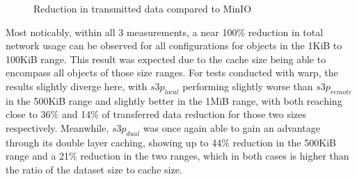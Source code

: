 \bandwidthrems
\pgfplotstabletranspose[colnames from=colnames]\Tbandwidthrems{\bandwidthrems}

\bandwidthduo
\pgfplotstabletranspose[colnames from=colnames]\Tbandwidthduo{\bandwidthduo}


\begin{figure}
	\centering
	\caption{Reduction in transmitted data compared to MinIO}
	\label{fig:bandwidth}
\end{figure}

Most noticably, within all 3 measurements, a near 100\% reduction in total network usage can be observed for all configurations for objects in the 1KiB to 100KiB range. This result was expected due to the cache size being able to encompass all objects of those size ranges.
For tests conducted with warp, the results slightly diverge here, with ${s3p}_{local}$ performing slightly worse than ${s3p}_{remote}$ in the 500KiB range and slightly better in the 1MiB range, with both reaching close to 36\% and 14\% of transferred data reduction for those two sizes respectively. Meanwhile, ${s3p}_{dual}$  was once again able to gain an advantage through its double layer caching, showing up to 44\% reduction in  the 500KiB range and a 21\% reduction in the two ranges, which in both cases is higher than the ratio of the dataset size to cache size.


